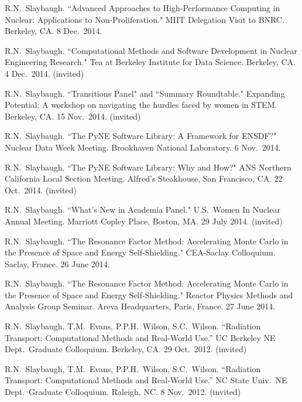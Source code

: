 \begin{bibsection}
\item R.N.\ Slaybaugh. ``Advanced Approaches to High-Performance Computing in Nuclear: Applications to Non-Proliferation." MIIT Delegation Visit to BNRC. Berkeley, CA. 8 Dec.\ 2014. 

\item R.N.\ Slaybaugh. ``Computational Methods and Software Development in Nuclear Engineering Research." Tea at Berkeley Institute for Data Science. Berkeley, CA. 4 Dec.\ 2014. (invited)

\item R.N.\ Slaybaugh. ``Transitions Panel" and ``Summary Roundtable." Expanding Potential: A workshop on navigating the hurdles faced by women in STEM. Berkeley, CA. 15 Nov.\ 2014. (invited)

\item R.N.\ Slaybaugh. ``The PyNE Software Library: A Framework for ENSDF?" Nuclear Data Week Meeting. Brookhaven National Laboratory. 6 Nov.\ 2014. 

\item R.N.\ Slaybaugh. ``The PyNE Software Library: Why and How?" ANS Northern California Local Section Meeting. Alfred's Steakhouse, San Francisco, CA. 22 Oct.\ 2014. (invited)

\item R.N.\ Slaybaugh. ``What's New in Academia Panel." U.S.\ Women In Nuclear Annual Meeting. Marriott Copley Place, Boston, MA. 29 July 2014. (invited)

\item R.N.\ Slaybaugh. ``The Resonance Factor Method: Accelerating Monte Carlo in the Presence of Space and Energy Self-Shielding." CEA-Saclay Colloquium. Saclay, France. 26 June 2014.

\item R.N.\ Slaybaugh. ``The Resonance Factor Method: Accelerating Monte Carlo in the Presence of Space and Energy Self-Shielding." Reactor Physics Methods and Analysis Group Seminar. Areva Headquarters, Paris, France. 27 June 2014.

\item R.N.\ Slaybaugh, T.M.\ Evans, P.P.H.\ Wilson, S.C.\ Wilson. ``Radiation Transport: Computational Methods and Real-World Use.'' UC Berkeley NE Dept.\ Graduate Colloquium. Berkeley, CA. 29 Oct.\ 2012. (invited)

\item R.N.\ Slaybaugh, T.M.\ Evans, P.P.H.\ Wilson, S.C.\ Wilson. ``Radiation Transport: Computational Methods and Real-World Use.'' NC State Univ.\ NE Dept.\ Graduate Colloquium. Raleigh, NC. 8 Nov.\ 2012. (invited)


\end{bibsection}
